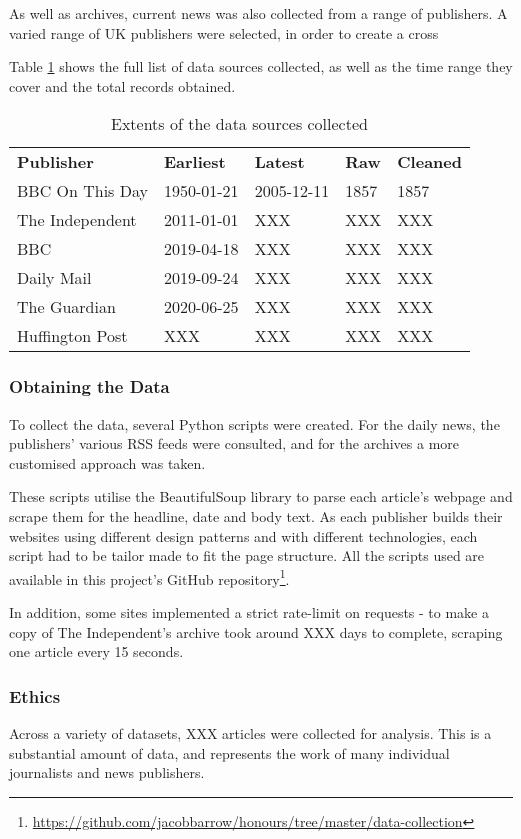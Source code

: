 As well as archives, current news was also collected from a range of publishers. A varied range of UK publishers were selected, in order to create a cross

Table \ref{tab:data-sources} shows the full list of data sources collected, as well as the time range they cover and the total records obtained.

\begin{table}[h]
\begin{tabular}{lllll}
\textbf{Publisher} & \textbf{Earliest} & \textbf{Latest} & \textbf{Raw} & \textbf{Cleaned} \\
BBC On This Day & 1950-01-21 & 2005-12-11 & 1857 & 1857 \\
The Independent & 2011-01-01 & XXX & XXX & XXX  \\
BBC & 2019-04-18 & XXX & XXX & XXX  \\
Daily Mail & 2019-09-24 & XXX & XXX & XXX \\
The Guardian & 2020-06-25 & XXX & XXX & XXX \\
Huffington Post & XXX & XXX & XXX & XXX \\
\end{tabular}
\caption{Extents of the data sources collected}
\label{tab:data-sources}
\end{table}

\subsubsection{Obtaining the Data} \label{obtaining-data}
To collect the data, several Python scripts were created. For the daily news, the publishers' various RSS feeds were consulted, and for the archives a more customised approach was taken.

These scripts utilise the BeautifulSoup library to parse each article's webpage and scrape them for the headline, date and body text. As each publisher builds their websites using different design patterns and with different technologies, each script had to be tailor made to fit the page structure. All the scripts used are available in this project's GitHub repository\footnote{\url{https://github.com/jacobbarrow/honours/tree/master/data-collection}}.

In addition, some sites implemented a strict rate-limit on requests - to make a copy of The Independent's archive took around XXX days to complete, scraping one article every 15 seconds. 

\subsubsection{Ethics}
Across a variety of datasets, XXX articles were collected for analysis. This is a substantial amount of data, and represents the work of many individual journalists and news publishers. 

